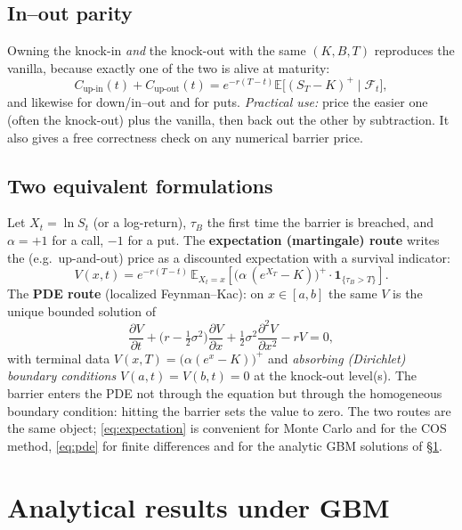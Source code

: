 \documentclass[11pt]{article}
\newcommand{\E}{\mathbb{E}}
\begin{document}
\subsection{In--out parity}
Owning the knock-in \emph{and} the knock-out with the same $(K,B,T)$ reproduces the vanilla, because exactly
one of the two is alive at maturity:
\begin{equation}\label{eq:parity}
C_{\text{up-in}}(t)+C_{\text{up-out}}(t)=e^{-r(T-t)}\E\big[(S_T-K)^+\mid\mathcal F_t\big],
\end{equation}
and likewise for down/in--out and for puts. \emph{Practical use:} price the easier one (often the knock-out)
plus the vanilla, then back out the other by subtraction. It also gives a free correctness check on any
numerical barrier price.

\subsection{Two equivalent formulations}
Let $X_t=\ln S_t$ (or a log-return), $\tau_B$ the first time the barrier is breached, and $\alpha=+1$ for a
call, $-1$ for a put. The \textbf{expectation (martingale) route} writes the (e.g.\ up-and-out) price as a
discounted expectation with a survival indicator:
\begin{equation}\label{eq:expectation}
V(x,t)=e^{-r(T-t)}\,\E_{X_t=x}\!\left[\big(\alpha\,(e^{X_T}-K)\big)^+\cdot\mathbf 1_{\{\tau_B>T\}}\right].
\end{equation}
The \textbf{PDE route} (localized Feynman--Kac): on $x\in[a,b]$ the same $V$ is the unique bounded solution of
\begin{equation}\label{eq:pde}
\frac{\partial V}{\partial t}+\big(r-\tfrac12\sigma^2\big)\frac{\partial V}{\partial x}
+\tfrac12\sigma^2\frac{\partial^2 V}{\partial x^2}-rV=0,
\end{equation}
with terminal data $V(x,T)=\big(\alpha(e^{x}-K)\big)^+$ and \emph{absorbing (Dirichlet) boundary conditions}
$V(a,t)=V(b,t)=0$ at the knock-out level(s). The barrier enters the PDE not through the equation but through
the homogeneous boundary condition: hitting the barrier sets the value to zero. The two routes are the same
object; \eqref{eq:expectation} is convenient for Monte Carlo and for the COS method, \eqref{eq:pde} for finite
differences and for the analytic GBM solutions of \S\ref{sec:gbm}.

\section{Analytical results under GBM}\label{sec:gbm}
\end{document}

